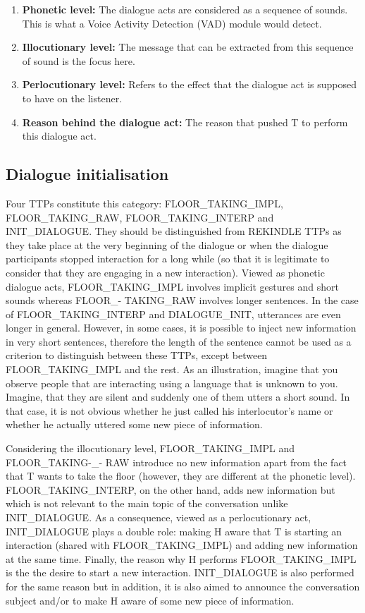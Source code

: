 		\begin{enumerate}
			\item \textbf{Phonetic level:} The dialogue acts are considered as a sequence of sounds. This is what a Voice Activity Detection (VAD) module would detect.
			\item \textbf{Illocutionary level:} The message that can be extracted from this sequence of sound is the focus here.
			\item \textbf{Perlocutionary level:} Refers to the effect that the dialogue act is supposed to have on the listener.
			\item \textbf{Reason behind the dialogue act:} The reason that pushed T to perform this dialogue act.
		\end{enumerate}

    \subsection{Dialogue initialisation}
    \label{tax:dialinit}
		
         Four TTPs constitute this category: FLOOR\_TAKING\_IMPL, FLOOR\_TAKING\_RAW, FLOOR\_TAKING\_INTERP and INIT\_DIALOGUE. They should be distinguished from REKINDLE TTPs as they take place at the very beginning of the dialogue or when the dialogue participants stopped interaction for a long while (so that it is legitimate to consider that they are engaging in a new interaction). Viewed as phonetic dialogue acts, FLOOR\_TAKING\_IMPL involves implicit gestures and short sounds whereas FLOOR\_- TAKING\_RAW involves longer sentences. In the case of FLOOR\_TAKING\_INTERP and DIALOGUE\_INIT, utterances are even longer in general. However, in some cases, it is possible to inject new information in very short sentences, therefore the length of the sentence cannot be used as a criterion to distinguish between these TTPs, except between FLOOR\_TAKING\_IMPL and the rest. As an illustration, imagine that you observe people that are interacting using a language that is unknown to you. Imagine, that they are silent and suddenly one of them utters a short sound. In that case, it is not obvious whether he just called his interlocutor's name or whether he actually uttered some new piece of information.
			
	 Considering the illocutionary level, FLOOR\_TAKING\_IMPL and FLOOR\_TAKING-\_- RAW introduce no new information apart from the fact that T wants to take the floor (however, they are different at the phonetic level). FLOOR\_TAKING\_INTERP, on the other hand, adds new information but which is not relevant to the main topic of the conversation unlike INIT\_DIALOGUE. As a consequence, viewed as a perlocutionary act, INIT\_DIALOGUE plays a double role: making H aware that T is starting an interaction (shared with FLOOR\_TAKING\_IMPL) and adding new information at the same time. Finally, the reason why H performs FLOOR\_TAKING\_IMPL is the the desire to start a new interaction. INIT\_DIALOGUE is also performed for the same reason but in addition, it is also aimed to announce the conversation subject and/or to make H aware of some new piece of information.

